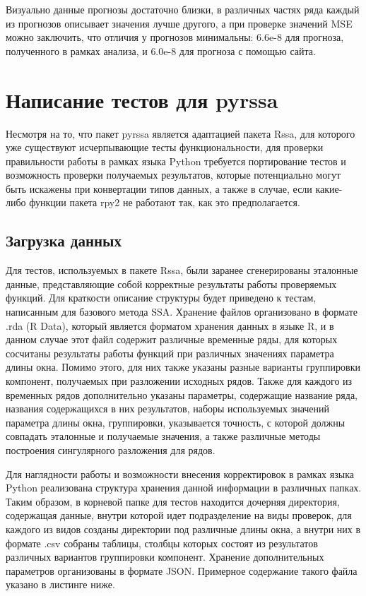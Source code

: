\documentclass[specialist,
			   substylefile = spbu_report.rtx,
			   subf,href,colorlinks=true, 12pt]{disser}
\begin{document}
Визуально данные прогнозы достаточно близки, в различных частях ряда каждый из прогнозов описывает значения лучше другого, а при проверке значений MSE можно заключить, что отличия у прогнозов минимальны: $6.6\text{e-}8$ для прогноза, полученного в рамках анализа, и $6.0\text{e-}8$ для прогноза с помощью сайта.

\chapter{Написание тестов для pyrssa}

Несмотря на то, что пакет pyrssa является адаптацией пакета Rssa, для которого уже существуют исчерпывающие тесты функциональности, для проверки правильности работы в рамках языка Python требуется портирование тестов и возможность проверки получаемых результатов, которые потенциально могут быть искажены при конвертации типов данных, а также в случае, если какие-либо функции пакета rpy2 не работают так, как это предполагается. 

\section{Загрузка данных}

Для тестов, используемых в пакете Rssa, были заранее сгенерированы эталонные данные, представляющие собой корректные результаты работы проверяемых функций. Для краткости описание структуры будет приведено к тестам, написанным для базового метода SSA. Хранение файлов организовано в формате .rda (R Data), который является форматом хранения данных в языке R, и в данном случае этот файл содержит различные временные ряды, для которых сосчитаны результаты работы функций при различных значениях параметра длины окна. Помимо этого, для них также указаны разные варианты группировки компонент, получаемых при разложении исходных рядов. Также для каждого из временных рядов дополнительно указаны параметры, содержащие название ряда, названия содержащихся в них результатов, наборы используемых значений параметра длины окна, группировки, указывается точность, с которой должны совпадать эталонные и получаемые значения, а также различные методы построения сингулярного разложения для рядов.

Для наглядности работы и возможности внесения корректировок в рамках языка Python реализована структура хранения данной информации в различных папках. Таким образом, в корневой папке для тестов находится дочерняя директория, содержащая данные, внутри которой идет подразделение на виды проверок, для каждого из видов созданы директории под различные длины окна, а внутри них в формате .csv собраны таблицы, столбцы которых состоят из результатов различных вариантов группировки компонент. Хранение дополнительных параметров организованы в формате JSON. Примерное содержание такого файла указано в листинге ниже.
\end{document}
